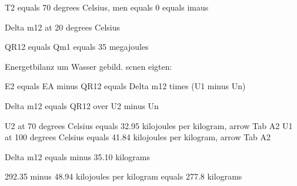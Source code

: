 T2 equals 70 degrees Celsius, men equals 0 equals imaus  

Delta m12 at 20 degrees Celsius  

QR12 equals Qm1 equals 35 megajoules  

Energetbilanz um Wasser gebild. scnen eigten:  

E2 equals EA minus QR12 equals Delta m12 times (U1 minus Un)  

Delta m12 equals QR12 over U2 minus Un  

U2 at 70 degrees Celsius equals 32.95 kilojoules per kilogram, arrow Tab A2  
U1 at 100 degrees Celsius equals 41.84 kilojoules per kilogram, arrow Tab A2  

Delta m12 equals minus 35.10 kilograms  

292.35 minus 48.94 kilojoules per kilogram equals 277.8 kilograms